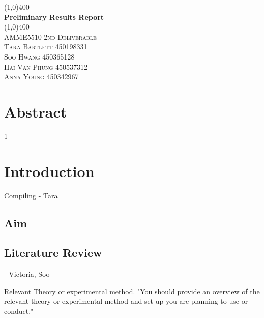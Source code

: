 \documentclass{article}
\begin{document}
\begin{titlepage}
	
\end{titlepage}
\cleardoublepage	
\begin{titlepage}
	\begin{center}
		
		\vspace{2cm}
		\line(1,0){400}\\
		[1cm]
		\huge{\bfseries Preliminary Results Report}\\
		[2mm]
		\line(1,0){400}\\
		[1.5cm]
		\textsc{\LARGE AMME5510 2nd Deliverable}\\
	\vspace{11.75cm}
		\textsc{\large Tara Bartlett 450198331}\\
		\textsc{\large Soo Hwang 450365128}\\
		\textsc{\large  Hai Van Phung 450537312}\\
		\textsc{\large Anna Young 450342967}
		
	\end{center}
\end{titlepage}


\section{Abstract}

\tableofcontents
\cleardoublepage


\setcounter{page}1

\newpage

\section{Introduction}
Compiling - Tara
\subsection{Aim}

\subsection{Literature Review} - Victoria, Soo

Relevant Theory or experimental method. "You should provide an overview of the relevant theory or experimental method and set-up you are planning to use or conduct."
\newpage
\end{document}
